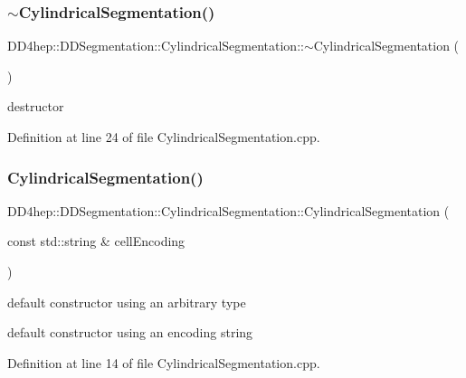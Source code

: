 \subsubsection{\texorpdfstring{$\sim$\+Cylindrical\+Segmentation()}{~CylindricalSegmentation()}}
{\footnotesize\ttfamily D\+D4hep\+::\+D\+D\+Segmentation\+::\+Cylindrical\+Segmentation\+::$\sim$\+Cylindrical\+Segmentation (\begin{DoxyParamCaption}{ }\end{DoxyParamCaption})\hspace{0.3cm}{\ttfamily [virtual]}}



destructor 



Definition at line 24 of file Cylindrical\+Segmentation.\+cpp.

\hypertarget{class_d_d4hep_1_1_d_d_segmentation_1_1_cylindrical_segmentation_afe34b42dad91d1b2fc50d21ecae094fe}{}\label{class_d_d4hep_1_1_d_d_segmentation_1_1_cylindrical_segmentation_afe34b42dad91d1b2fc50d21ecae094fe} 
\subsubsection{\texorpdfstring{Cylindrical\+Segmentation()}{CylindricalSegmentation()}\hspace{0.1cm}{\footnotesize\ttfamily [1/2]}}
{\footnotesize\ttfamily D\+D4hep\+::\+D\+D\+Segmentation\+::\+Cylindrical\+Segmentation\+::\+Cylindrical\+Segmentation (\begin{DoxyParamCaption}\item[{const std\+::string \&}]{cell\+Encoding }\end{DoxyParamCaption})\hspace{0.3cm}{\ttfamily [protected]}}



default constructor using an arbitrary type 

default constructor using an encoding string 

Definition at line 14 of file Cylindrical\+Segmentation.\+cpp.

\hypertarget{class_d_d4hep_1_1_d_d_segmentation_1_1_cylindrical_segmentation_ab523036ee9a48b8a7046c99b12cc8401}{}\label{class_d_d4hep_1_1_d_d_segmentation_1_1_cylindrical_segmentation_ab523036ee9a48b8a7046c99b12cc8401} 
